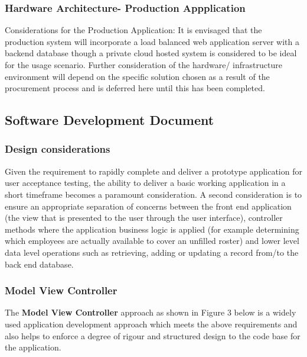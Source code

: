 \documentclass[a4paper,12pt]{article}
\begin{document}
\subsubsection{Hardware Architecture- Production Appplication}

Considerations for the Production Application: It is envisaged that the production system will incorporate a load balanced web application server with a backend database though a private cloud hosted system is considered to be ideal for the usage scenario. Further consideration of the hardware/ infrastructure environment will depend on the specific solution chosen as a result of the procurement process and is deferred here until this has been completed.

\subsection {Software Development Document}
\subsubsection{Design considerations}
Given the requirement to rapidly complete and deliver a prototype application for user acceptance testing, the ability to deliver a basic working application in a short timeframe becomes a paramount consideration. A second consideration is to ensure an appropriate separation of concerns between the front end application (the view that is presented to the user through the user interface), controller methods where the application business logic is applied (for example determining which employees are actually available to cover an unfilled roster) and lower level data level operations such as retrieving, adding or updating a record from/to the back end database.
\subsubsection{Model View Controller}

The \textbf{Model View Controller} approach as shown in Figure 3 below is a widely used application development approach which meets the above requirements and also helps to enforce a degree of rigour and structured design to the code base for the application.
\end{document}
